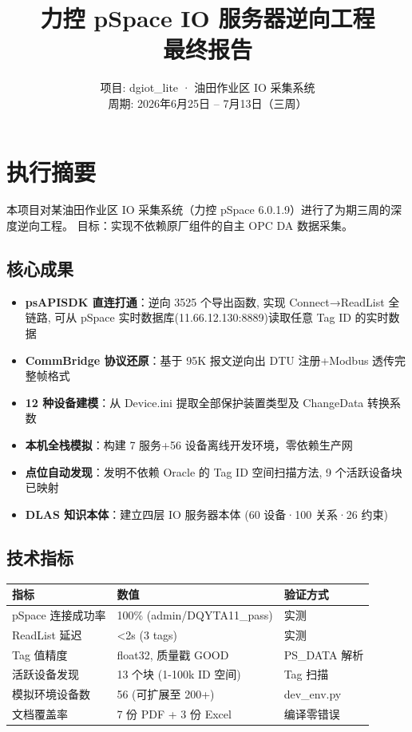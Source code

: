 \documentclass[12pt,a4paper]{ctexart}
\title{\textbf{力控 pSpace IO 服务器逆向工程\\最终报告}}
\author{项目: dgiot\_lite · 油田作业区 IO 采集系统\\周期: 2026年6月25日 -- 7月13日（三周）}
\date{}
\begin{document}
\maketitle
\tableofcontents
\newpage

\section{执行摘要}

本项目对某油田作业区 IO 采集系统（力控 pSpace 6.0.1.9）进行了为期三周的深度逆向工程。
目标：实现不依赖原厂组件的自主 OPC DA 数据采集。

\subsection{核心成果}
\begin{itemize}[leftmargin=*]
  \item \textbf{psAPISDK 直连打通}：逆向 3525 个导出函数, 实现 Connect→ReadList 全链路,
  可从 pSpace 实时数据库(11.66.12.130:8889)读取任意 Tag ID 的实时数据
  \item \textbf{CommBridge 协议还原}：基于 95K 报文逆向出 DTU 注册+Modbus 透传完整帧格式
  \item \textbf{12 种设备建模}：从 Device.ini 提取全部保护装置类型及 ChangeData 转换系数
  \item \textbf{本机全栈模拟}：构建 7 服务+56 设备离线开发环境，零依赖生产网
  \item \textbf{点位自动发现}：发明不依赖 Oracle 的 Tag ID 空间扫描方法, 9 个活跃设备块已映射
  \item \textbf{DLAS 知识本体}：建立四层 IO 服务器本体 (60 设备·100 关系·26 约束)
\end{itemize}

\subsection{技术指标}
\begin{table}[H]\centering
\begin{tabular}{lll}
\toprule
\textbf{指标} & \textbf{数值} & \textbf{验证方式} \\
\midrule
pSpace 连接成功率 & 100\% (admin/DQYTA11\_pass) & 实测 \\
ReadList 延迟 & <2s (3 tags) & 实测 \\
Tag 值精度 & float32, 质量戳 GOOD & PS\_DATA 解析 \\
活跃设备发现 & 13 个块 (1-100k ID 空间) & Tag 扫描 \\
模拟环境设备数 & 56 (可扩展至 200+) & dev\_env.py \\
文档覆盖率 & 7 份 PDF + 3 份 Excel & 编译零错误 \\
\bottomrule
\end{tabular}
\end{table}
\end{document}
